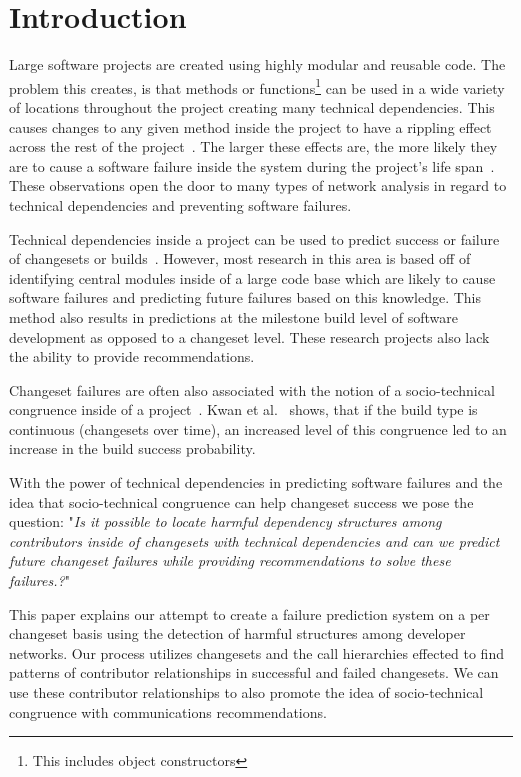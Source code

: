 \documentclass[conference]{IEEEtran}
\begin{document}
\section{Introduction}

Large software projects are created using highly modular and 
reusable code. The problem this creates, is that methods or functions\footnote{This includes object constructors} 
can be used in a wide variety of locations throughout the project creating many technical 
dependencies.  This causes changes to any given method inside the project to have a rippling 
effect across the rest of the project~\cite{Acharya:2011:PCI}. The larger these effects are,
the more likely they are to cause a software failure inside the system during the project's
life span~\cite{Zimmermann:2008:PDU}. These observations open the door to many types
of network analysis in regard to technical dependencies and preventing software failures.

Technical dependencies inside a project can be used to predict success or failure of 
changesets or builds~\cite{Pinzger:2008:DNP, Zimmermann:2008:PDU}. However, most 
research in this area is based off of identifying
central modules inside of a large code base which are likely to cause software failures and 
predicting future failures based on this knowledge. This method also results in predictions 
at the milestone build level of software development as opposed to a changeset level.
These research projects also lack the ability to provide recommendations.

Changeset failures are often also associated with the notion of a socio-technical 
congruence inside of a project~\cite{Conway:1968}. Kwan et al.~\cite{Kwan:2011:SD} shows, 
that if the build type is continuous (changesets over time), an increased level of this
congruence led to an increase in the build success probability. 

With the power of technical dependencies in predicting software failures and the idea
that socio-technical congruence can help changeset success we pose the question: 
"\textit{Is it possible to locate harmful dependency structures among contributors inside
of changesets with technical dependencies and can we predict future changeset failures
while providing recommendations to solve these failures.?}"

This paper explains our attempt to create a failure prediction system on a per changeset basis using
the detection of harmful structures among developer networks.
Our process utilizes changesets and the call hierarchies effected  to find patterns of contributor 
relationships in successful and failed changesets.  We can use these contributor relationships 
to also promote the idea of socio-technical congruence with communications recommendations.
\end{document}

